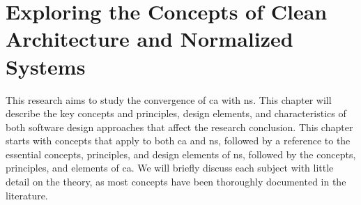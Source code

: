 \chapter{Exploring the Concepts of Clean Architecture and Normalized Systems} \label{chap_theoreticalbackground} 

This research aims to study the convergence of \gls{ca} with \gls{ns}. This chapter will
describe the key concepts and principles, design elements, and characteristics of both
software design approaches that affect the research conclusion. This chapter starts with
concepts that apply to both \gls{ca} and \gls{ns}, followed by a reference to the
essential concepts, principles, and design elements of \gls{ns}, followed by the concepts,
principles, and elements of \gls{ca}. We will briefly discuss each subject with little
detail on the theory, as most concepts have been thoroughly documented in the literature.





